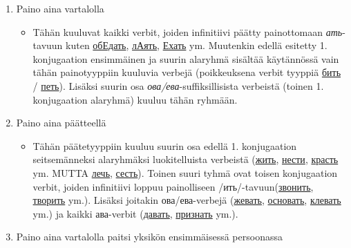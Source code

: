 \documentclass[]{scrartcl}
\providecommand{\tightlist}{%
  \setlength{\itemsep}{0pt}\setlength{\parskip}{0pt}}
\begin{document}
\begin{enumerate}
\def\labelenumi{\arabic{enumi}.}
\tightlist
\item
  Paino aina vartalolla

  \begin{itemize}
  \tightlist
  \item
    Tähän kuuluvat kaikki verbit, joiden infinitiivi päätty painottomaan
    \emph{ать}-tavuun kuten
    \href{http://ru.wiktionary.org/wiki/\%D0\%BE\%D0\%B1Едать}{обЕдать},
    \href{http://ru.wiktionary.org/wiki/\%D0\%BBАять}{лАять},
    \href{http://ru.wiktionary.org/wiki/Ехать}{Ехать} ym. Muutenkin
    edellä esitetty 1. konjugaation ensimmäinen ja suurin alaryhmä
    sisältää käytännössä vain tähän painotyyppiin kuuluvia verbejä
    (poikkeuksena verbit tyyppiä
    \href{http://ru.wiktionary.org/wiki/\%D0\%B1\%D0\%B8\%D1\%82\%D1\%8C}{бить}
    /
    \href{http://ru.wiktionary.org/wiki/\%D0\%BF\%D0\%B5\%D1\%82\%D1\%8C}{петь}).
    Lisäksi suurin osa \emph{ова/ева}-suffiksillisista verbeistä (toinen
    1. konjugaation alaryhmä) kuuluu tähän ryhmään.
  \end{itemize}
\item
  Paino aina päätteellä

  \begin{itemize}
  \tightlist
  \item
    Tähän päätetyyppiin kuuluu suurin osa edellä 1. konjugaation
    seitsemänneksi alaryhmäksi luokitelluista verbeistä
    (\href{http://ru.wiktionary.org/wiki/\%D0\%B6\%D0\%B8\%D1\%82\%D1\%8C}{жить},
    \href{http://ru.wiktionary.org/wiki/\%D0\%BD\%D0\%B5\%D1\%81\%D1\%82\%D0\%B8}{нести},
    \href{http://ru.wiktionary.org/wiki/\%D0\%BA\%D1\%80\%D0\%B0\%D1\%81\%D1\%82\%D1\%8C}{красть}
    ym. MUTTA
    \href{http://ru.wiktionary.org/wiki/\%D0\%BB\%D0\%B5\%D1\%87\%D1\%8C}{лечь},
    \href{http://ru.wiktionary.org/wiki/\%D1\%81\%D0\%B5\%D1\%81\%D1\%82\%D1\%8C}{сесть}).
    Toinen suuri tyhmä ovat toisen konjugaation verbit, joiden
    infinitiivi loppuu painolliseen
    /ить/-tavuun(\href{http://ru.wiktionary.org/wiki/\%D0\%B7\%D0\%B2\%D0\%BE\%D0\%BD\%D0\%B8\%D1\%82\%D1\%8C}{звонить},
    \href{http://ru.wiktionary.org/wiki/\%D1\%82\%D0\%B2\%D0\%BE\%D1\%80\%D0\%B8\%D1\%82\%D1\%8C}{творить}
    ym.). Lisäksi joitakin ова/ева-verbejä
    (\href{http://ru.wiktionary.org/wiki/\%D0\%B6\%D0\%B5\%D0\%B2\%D0\%B0\%D1\%82\%D1\%8C}{жевать},
    \href{http://ru.wiktionary.org/wiki/\%D0\%BE\%D1\%81\%D0\%BD\%D0\%BE\%D0\%B2\%D0\%B0\%D1\%82\%D1\%8C}{основать},
    \href{http://ru.wiktionary.org/wiki/\%D0\%BA\%D0\%BB\%D0\%B5\%D0\%B2\%D0\%B0\%D1\%82\%D1\%8C}{клевать}
    ym.) ja kaikki ава-verbit
    (\href{http://ru.wiktionary.org/wiki/\%D0\%B4\%D0\%B0\%D0\%B2\%D0\%B0\%D1\%82\%D1\%8C}{давать},
    \href{http://ru.wiktionary.org/wiki/\%D0\%BF\%D1\%80\%D0\%B8\%D0\%B7\%D0\%BD\%D0\%B0\%D1\%82\%D1\%8C}{признать}
    ym.).
  \end{itemize}
\item
  Paino aina vartalolla paitsi yksikön ensimmäisessä persoonassa


\end{enumerate}
\end{document}
